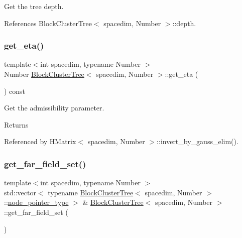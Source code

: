 Get the tree depth. 

References Block\+Cluster\+Tree$<$ spacedim, Number $>$\+::depth.

\mbox{\label{classBlockClusterTree_a312d01ddb6cf5560d84abf7d254fa2c3}} 
\subsubsection{\texorpdfstring{get\+\_\+eta()}{get\_eta()}}
{\footnotesize\ttfamily template$<$int spacedim, typename Number $>$ \\
Number \hyperlink{classBlockClusterTree}{Block\+Cluster\+Tree}$<$ spacedim, Number $>$\+::get\+\_\+eta (\begin{DoxyParamCaption}{ }\end{DoxyParamCaption}) const}

Get the admissibility parameter. \begin{DoxyReturn}{Returns}

\end{DoxyReturn}


Referenced by H\+Matrix$<$ spacedim, Number $>$\+::invert\+\_\+by\+\_\+gauss\+\_\+elim().

\mbox{\label{classBlockClusterTree_a2980726dc3789773b5cd3c04df5e69a3}} 
\subsubsection{\texorpdfstring{get\+\_\+far\+\_\+field\+\_\+set()}{get\_far\_field\_set()}\hspace{0.1cm}{\footnotesize\ttfamily [1/2]}}
{\footnotesize\ttfamily template$<$int spacedim, typename Number $>$ \\
std\+::vector$<$ typename \hyperlink{classBlockClusterTree}{Block\+Cluster\+Tree}$<$ spacedim, Number $>$\+::\hyperlink{classTreeNode}{node\+\_\+pointer\+\_\+type} $>$ \& \hyperlink{classBlockClusterTree}{Block\+Cluster\+Tree}$<$ spacedim, Number $>$\+::get\+\_\+far\+\_\+field\+\_\+set (\begin{DoxyParamCaption}{ }\end{DoxyParamCaption})}

